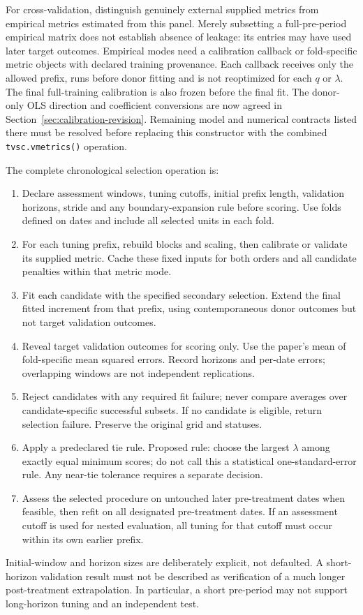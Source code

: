 \documentclass[11pt]{article}
\begin{document}
For cross-validation, distinguish genuinely external supplied metrics
from empirical metrics estimated from this panel. Merely subsetting a
full-pre-period empirical matrix does not establish absence of leakage:
its entries may have used later target outcomes. Empirical modes need a
calibration callback or fold-specific metric objects with declared training
provenance. Each callback receives only the allowed prefix, runs before
donor fitting and is not reoptimized for each $q$ or $\lambda$.
The final full-training calibration is also frozen before the final fit.
The donor-only OLS direction and coefficient conversions are now agreed
in Section~\ref{sec:calibration-revision}. Remaining model and numerical
contracts listed there must be resolved before replacing this constructor
with the combined \texttt{tvsc.vmetrics()} operation.

The complete chronological selection operation is:
\begin{enumerate}
\item Declare assessment windows, tuning cutoffs, initial prefix length,
validation horizons, stride and any boundary-expansion rule before scoring.
Use folds defined on dates and include all selected units in each fold.
\item For each tuning prefix, rebuild blocks and scaling, then calibrate
or validate its supplied metric. Cache these fixed inputs for both orders
and all candidate penalties within that metric mode.
\item Fit each candidate with the specified secondary selection. Extend
the final fitted increment from that prefix, using contemporaneous donor
outcomes but not target validation outcomes.
\item Reveal target validation outcomes for scoring only. Use the paper's
mean of fold-specific mean squared errors. Record horizons and per-date
errors; overlapping windows are not independent replications.
\item Reject candidates with any required fit failure; never compare
averages over candidate-specific successful subsets. If no candidate is
eligible, return selection failure. Preserve the original grid and statuses.
\item Apply a predeclared tie rule. Proposed rule: choose the largest
$\lambda$ among exactly equal minimum scores; do not call this a statistical
one-standard-error rule. Any near-tie tolerance requires a separate decision.
\item Assess the selected procedure on untouched later pre-treatment dates
when feasible, then refit on all designated pre-treatment dates. If an
assessment cutoff is used for nested evaluation, all tuning for that cutoff
must occur within its own earlier prefix.
\end{enumerate}
Initial-window and horizon sizes are deliberately explicit, not defaulted.
A short-horizon validation result must not be described as verification
of a much longer post-treatment extrapolation. In particular, a short
pre-period may not support long-horizon tuning and an independent test.
\end{document}
